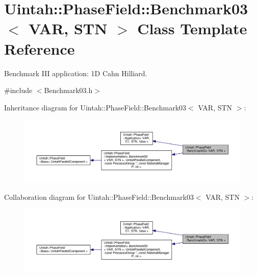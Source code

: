 \hypertarget{classUintah_1_1PhaseField_1_1Benchmark03}{}\section{Uintah\+:\+:Phase\+Field\+:\+:Benchmark03$<$ V\+AR, S\+TN $>$ Class Template Reference}
\label{classUintah_1_1PhaseField_1_1Benchmark03}


Benchmark I\+II application\+: 1D Cahn Hilliard.  




{\ttfamily \#include $<$Benchmark03.\+h$>$}



Inheritance diagram for Uintah\+:\+:Phase\+Field\+:\+:Benchmark03$<$ V\+AR, S\+TN $>$\+:\nopagebreak
\begin{figure}[H]
\begin{center}
\leavevmode
\includegraphics[width=350pt]{classUintah_1_1PhaseField_1_1Benchmark03__inherit__graph}
\end{center}
\end{figure}


Collaboration diagram for Uintah\+:\+:Phase\+Field\+:\+:Benchmark03$<$ V\+AR, S\+TN $>$\+:\nopagebreak
\begin{figure}[H]
\begin{center}
\leavevmode
\includegraphics[width=350pt]{classUintah_1_1PhaseField_1_1Benchmark03__coll__graph}
\end{center}
\end{figure}
